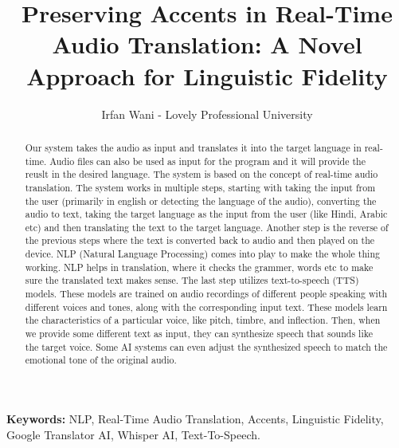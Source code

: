 \documentclass[12px, a4paper]{article}
\title{Preserving Accents in Real-Time Audio Translation: A Novel Approach for Linguistic Fidelity}
\author{Irfan Wani - Lovely Professional University}
\begin{document}
    
\maketitle
    \begin{abstract}
    Our system takes the audio as input and translates it into the target language in real-time. Audio files can also be used as input for the program and it will provide the reuslt in the desired language. The system is based on the concept of real-time audio translation. The system works in multiple steps, starting with taking the input from the user (primarily in english or detecting the language of the audio), converting the audio to text, taking the target language as the input from the user (like Hindi, Arabic etc) and then translating the text to the target language. Another step is the reverse of the previous steps where the text is converted back to audio and then played on the device.  NLP (Natural Language Processing) comes into play to make the whole thing working. NLP helps in translation, where it checks the grammer, words etc to make sure the translated text makes sense.
    The last step utilizes text-to-speech (TTS) models. These models are trained on audio recordings of different people speaking with different voices and tones, along with the corresponding input text. These models learn the characteristics of a particular voice, like pitch, timbre, and inflection. Then, when we provide some different text as input, they can synthesize speech that sounds like the target voice. Some AI systems can even adjust the synthesized speech to match the emotional tone of the original audio.
    \end{abstract}
    \textbf{Keywords: } NLP, Real-Time Audio Translation, Accents, Linguistic Fidelity, Google Translator AI, Whisper AI, Text-To-Speech.
\end{document}
